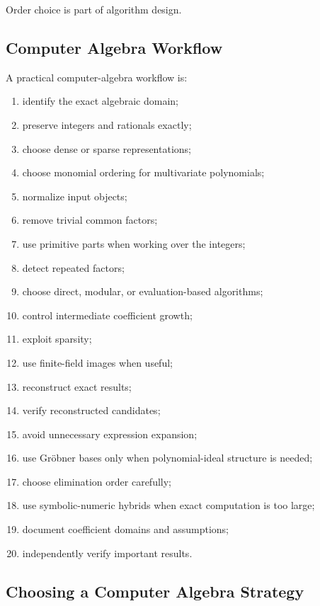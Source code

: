 Order choice is part of algorithm design.

\subsection{Computer Algebra Workflow}
\label{subsec:computer-algebra-workflow}

A practical computer-algebra workflow is:

\begin{enumerate}
    \item identify the exact algebraic domain;
    \item preserve integers and rationals exactly;
    \item choose dense or sparse representations;
    \item choose monomial ordering for multivariate polynomials;
    \item normalize input objects;
    \item remove trivial common factors;
    \item use primitive parts when working over the integers;
    \item detect repeated factors;
    \item choose direct, modular, or evaluation-based algorithms;
    \item control intermediate coefficient growth;
    \item exploit sparsity;
    \item use finite-field images when useful;
    \item reconstruct exact results;
    \item verify reconstructed candidates;
    \item avoid unnecessary expression expansion;
    \item use Gröbner bases only when polynomial-ideal structure is needed;
    \item choose elimination order carefully;
    \item use symbolic-numeric hybrids when exact computation is too large;
    \item document coefficient domains and assumptions;
    \item independently verify important results.
\end{enumerate}

\subsection{Choosing a Computer Algebra Strategy}
\label{subsec:choosing-computer-algebra-strategy}

